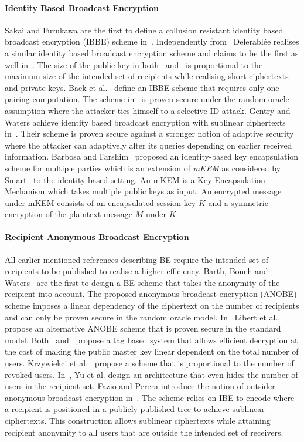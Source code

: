 \documentclass[11pt]{article}
\begin{document}
\paragraph{Identity Based Broadcast Encryption} Sakai and Furukawa are the first to define a collusion resistant identity based broadcast encryption (IBBE) scheme in~\cite{SakaiF07}. Independently from~\cite{SakaiF07} Delerabl\'{e}e realises a similar identity based broadcast encryption scheme and claims to be the first as well in~\cite{DelerableeIBBE}.  The size of the public key in both~\cite{SakaiF07} and~\cite{DelerableeIBBE} is proportional to the maximum size of the intended set of recipients while realising short ciphertexts and private keys. Baek et al.~\cite{BaekIBEandBE} define an IBBE scheme that requires only one pairing computation. The scheme in~\cite{BaekIBEandBE} is proven secure under the random oracle assumption where the attacker ties himself to a selective-ID attack. Gentry and Waters achieve identity based broadcast encryption with sublinear ciphertexts in~\cite{GentryW08}. Their scheme is proven secure against a stronger notion of adaptive security where the attacker can adaptively alter its queries depending on earlier received information. Barbosa and Farshim~\cite{BarbosaIBEKEM} proposed an identity-based key encapsulation scheme for multiple parties which is an extension of \textit{mKEM} as considered by Smart~\cite{SmartMKEM} to the identity-based setting. An mKEM is a Key Encapsulation Mechanism which takes multiple public keys as input. An encrypted message under mKEM consists of an encapsulated session key $K$ and a symmetric encryption of the plaintext message $M$ under $K$.

\paragraph{Recipient Anonymous Broadcast Encryption} All earlier mentioned references describing BE require the intended set of recipients to be published to realise a higher efficiency. Barth, Boneh and Waters~\cite{BarthBonehWaters} are the first to design a BE scheme that takes the anonymity of the recipient into account. The proposed anonymous broadcast encryption (ANOBE) scheme imposes a linear dependency of the ciphertext on the number of recipients and can only be proven secure in the random oracle model. In~\cite{LibertANOBE} Libert et al., propose an alternative ANOBE scheme that is proven secure in the standard model. Both~\cite{BarthBonehWaters} and~\cite{LibertANOBE} propose a tag based system that allows efficient decryption at the cost of making the public master key linear dependent on the total number of users. Krzywiekci et al.~\cite{KrzywieckiKK06} propose a scheme that is proportional to the number of revoked users. In~\cite{YuRL10}, Yu et al. design an architecture that even hides the number of users in the recipient set. Fazio and Perera introduce the notion of outsider anonymous broadcast encryption in~\cite{FazioOutsiderANOBE}. The scheme relies on IBE to encode where a recipient is positioned in a publicly published tree to achieve sublinear ciphertexts. This construction allows sublinear ciphertexts while attaining recipient anonymity to all users that are outside the intended set of receivers.



\end{document}
